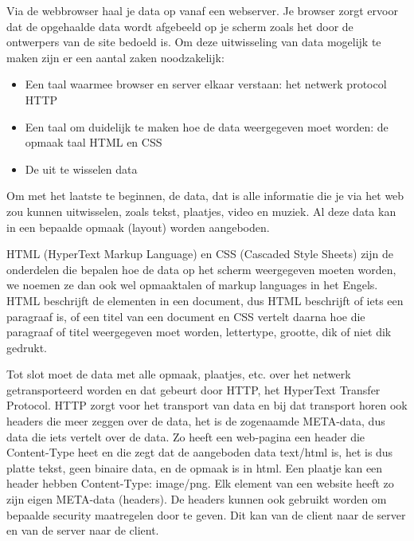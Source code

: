 Via de webbrowser haal je data op vanaf een webserver. Je browser zorgt ervoor dat de opgehaalde data wordt afgebeeld op je scherm zoals het door de ontwerpers van de site bedoeld is. Om deze uitwisseling van data mogelijk te maken zijn er een aantal zaken noodzakelijk:
\begin{itemize}
\item Een taal waarmee browser en server elkaar verstaan: het netwerk protocol HTTP
\item Een taal om duidelijk te maken hoe de data weergegeven moet worden: de opmaak taal HTML en CSS
\item De uit te wisselen data
\end{itemize}

Om met het laatste te beginnen, de data, dat is alle informatie die je via het web zou kunnen uitwisselen, zoals tekst, plaatjes, video en muziek. Al deze data kan in een bepaalde opmaak (layout) worden aangeboden.

HTML (HyperText Markup Language) en CSS (Cascaded Style Sheets) zijn de onderdelen die bepalen hoe de data op het scherm weergegeven moeten worden, we noemen ze dan ook wel opmaaktalen of markup languages in het Engels. HTML beschrijft de elementen in een document, dus HTML beschrijft of iets een paragraaf is, of een titel van een document en CSS vertelt daarna hoe die paragraaf of titel weergegeven moet worden, lettertype, grootte, dik of niet dik gedrukt.

Tot slot moet de data met alle opmaak, plaatjes, etc. over het netwerk getransporteerd worden en dat gebeurt door HTTP, het HyperText Transfer Protocol. HTTP zorgt voor het transport van data en bij dat transport horen ook headers die meer zeggen over de data, het is de zogenaamde META-data, dus data die iets vertelt over de data. Zo heeft een web-pagina een header die Content-Type heet en die zegt dat de aangeboden data text/html is, het is dus platte tekst, geen binaire data, en de opmaak is in html. Een plaatje kan een header hebben Content-Type: image/png. Elk element van een website heeft zo zijn eigen META-data (headers). De headers kunnen ook gebruikt worden om bepaalde security maatregelen door te geven. Dit kan van de client naar de server en van de server naar de client.
